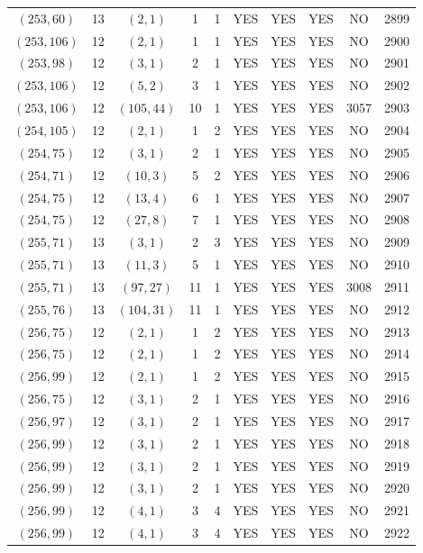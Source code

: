 \begin{longtable}{|c|c|c|c|c|c|c|c|c|c|}
$(253, 60)$ & 13 & $(2, 1)$ & 1 & 1 & YES & YES & YES & NO & 2899\\
$(253, 106)$ & 12 & $(2, 1)$ & 1 & 1 & YES & YES & YES & NO & 2900\\
$(253, 98)$ & 12 & $(3, 1)$ & 2 & 1 & YES & YES & YES & NO & 2901\\
$(253, 106)$ & 12 & $(5, 2)$ & 3 & 1 & YES & YES & YES & NO & 2902\\
$(253, 106)$ & 12 & $(105, 44)$ & 10 & 1 & YES & YES & YES & 3057 & 2903\\
$(254, 105)$ & 12 & $(2, 1)$ & 1 & 2 & YES & YES & YES & NO & 2904\\
$(254, 75)$ & 12 & $(3, 1)$ & 2 & 1 & YES & YES & YES & NO & 2905\\
$(254, 71)$ & 12 & $(10, 3)$ & 5 & 2 & YES & YES & YES & NO & 2906\\
$(254, 75)$ & 12 & $(13, 4)$ & 6 & 1 & YES & YES & YES & NO & 2907\\
$(254, 75)$ & 12 & $(27, 8)$ & 7 & 1 & YES & YES & YES & NO & 2908\\
$(255, 71)$ & 13 & $(3, 1)$ & 2 & 3 & YES & YES & YES & NO & 2909\\
$(255, 71)$ & 13 & $(11, 3)$ & 5 & 1 & YES & YES & YES & NO & 2910\\
$(255, 71)$ & 13 & $(97, 27)$ & 11 & 1 & YES & YES & YES & 3008 & 2911\\
$(255, 76)$ & 13 & $(104, 31)$ & 11 & 1 & YES & YES & YES & NO & 2912\\
$(256, 75)$ & 12 & $(2, 1)$ & 1 & 2 & YES & YES & YES & NO & 2913\\
$(256, 75)$ & 12 & $(2, 1)$ & 1 & 2 & YES & YES & YES & NO & 2914\\
$(256, 99)$ & 12 & $(2, 1)$ & 1 & 2 & YES & YES & YES & NO & 2915\\
$(256, 75)$ & 12 & $(3, 1)$ & 2 & 1 & YES & YES & YES & NO & 2916\\
$(256, 97)$ & 12 & $(3, 1)$ & 2 & 1 & YES & YES & YES & NO & 2917\\
$(256, 99)$ & 12 & $(3, 1)$ & 2 & 1 & YES & YES & YES & NO & 2918\\
$(256, 99)$ & 12 & $(3, 1)$ & 2 & 1 & YES & YES & YES & NO & 2919\\
$(256, 99)$ & 12 & $(3, 1)$ & 2 & 1 & YES & YES & YES & NO & 2920\\
$(256, 99)$ & 12 & $(4, 1)$ & 3 & 4 & YES & YES & YES & NO & 2921\\
$(256, 99)$ & 12 & $(4, 1)$ & 3 & 4 & YES & YES & YES & NO & 2922\\

\end{longtable}
